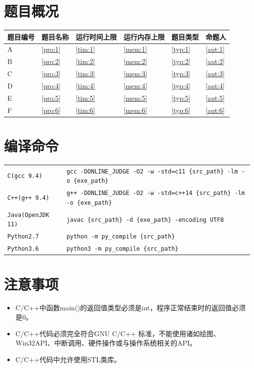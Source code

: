 \documentclass[
	lang=cn,
	color=green
]{elegantbook}
\begin{document}
\begin{titlepage}
	\section*{题目概况}
	\begin{tabularx}{450pt}{M|M|M|M|M|M}
		\toprule
		\textbf{题目编号} & \textbf{题目名称} & \textbf{运行时间上限} & \textbf{运行内存上限} & \textbf{题目类型} & \textbf{命题人} \\
		\midrule
		A                 & \ref*{pro:1}      & \ref*{tim:1}          & \ref*{mem:1}          & \ref*{typ:1}      & \ref*{aut:1}    \\
		B                 & \ref*{pro:2}      & \ref*{tim:2}          & \ref*{mem:2}          & \ref*{typ:2}      & \ref*{aut:2}    \\
		C                 & \ref*{pro:3}      & \ref*{tim:3}          & \ref*{mem:3}          & \ref*{typ:3}      & \ref*{aut:3}    \\
		D                 & \ref*{pro:4}      & \ref*{tim:4}          & \ref*{mem:4}          & \ref*{typ:4}      & \ref*{aut:4}    \\
		E                 & \ref*{pro:5}      & \ref*{tim:5}          & \ref*{mem:5}          & \ref*{typ:5}      & \ref*{aut:5}    \\
		F                 & \ref*{pro:6}      & \ref*{tim:6}          & \ref*{mem:6}          & \ref*{typ:6}      & \ref*{aut:6}    \\
		\bottomrule
	\end{tabularx}

	\section*{编译命令}
	\small
	\begin{tabularx}{450pt}{l|X}
		\toprule
		\verb|C(gcc 9.4)| & \verb|gcc -DONLINE_JUDGE -O2 -w -std=c11 {src_path} -lm -o {exe_path}|  \\
		\verb|C++(g++ 9.4)| & \verb|g++ -DONLINE_JUDGE -O2 -w -std=c++14 {src_path} -lm -o {exe_path}|  \\
		\verb|Java(OpenJDK 11)| & \verb|javac {src_path} -d {exe_path} -encoding UTF8|  \\
		\verb|Python2.7| & \verb|python -m py_compile {src_path}|  \\
		\verb|Python3.6| & \verb|python3 -m py_compile {src_path}| \\
		\bottomrule
	\end{tabularx}
	\normalsize

	\section*{注意事项}
	\begin{itemize}
		\item C/C++中函数main()的返回值类型必须是int，程序正常结束时的返回值必须是0。
		\item C/C++代码必须完全符合GNU C/C++ 标准，不能使用诸如绘图、Win32API、中断调用、硬件操作或与操作系统相关的API。
		\item C/C++代码中允许使用STL类库。
	\end{itemize}


\end{titlepage}
\end{document}
